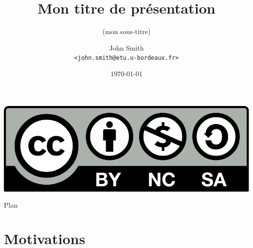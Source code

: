 %
%

\usepackage[french]{babel}


\newcommand{\highlight}[1]{\textcolor{structure.fg}{\bfseries #1}}

\title{Mon titre de présentation}
\subtitle{(mon sous-titre)}

\author[John Smith]{John Smith\\[-.25em]
\texttt{\scriptsize <john.smith@etu.u-bordeaux.fr>}}


\date{\today}



\begin{frame}{}
  \vspace{3.5em}
  \titlepage

  \begin{center}
    \includegraphics[scale=.2]{cc-by-nc-sa.pdf}
  \end{center}
\end{frame}

\begin{frame}{Plan}
  \tableofcontents[subsectionstyle=hide]
\end{frame}

\section{Motivations}


